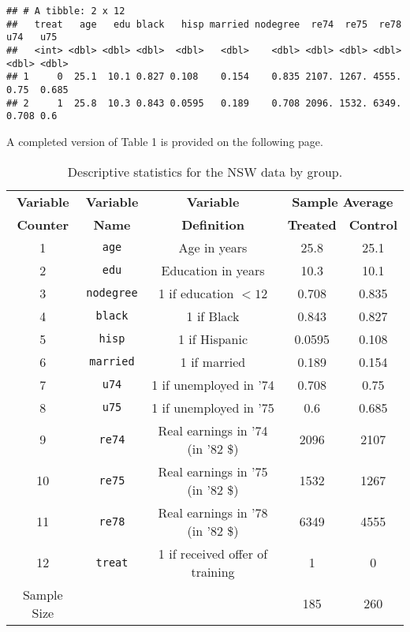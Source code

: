 \documentclass[
]{article}
\begin{document}
\begin{verbatim}
## # A tibble: 2 x 12
##   treat   age   edu black   hisp married nodegree  re74  re75  re78   u74   u75
##   <int> <dbl> <dbl> <dbl>  <dbl>   <dbl>    <dbl> <dbl> <dbl> <dbl> <dbl> <dbl>
## 1     0  25.1  10.1 0.827 0.108    0.154    0.835 2107. 1267. 4555. 0.75  0.685
## 2     1  25.8  10.3 0.843 0.0595   0.189    0.708 2096. 1532. 6349. 0.708 0.6
\end{verbatim}

A completed version of Table 1 is provided on the following page.
\newpage

\begin{table}[!ht!]
\centering
\begin{tabular}{ccccc}
\hline
\textbf{Variable} & \textbf{Variable}    & \textbf{Variable}    & \multicolumn{2}{c}{\textbf{Sample Average}}    \\ \cline{4-5} 
\textbf{Counter} & \textbf{Name}       & \textbf{Definition}                        & \textbf{Treated} & \textbf{Control} \\ \hline
1 & \texttt{age}      & Age in years                      & 25.8        & 25.1       \\
2 & \texttt{edu}      & Education in years                & 10.3        & 10.1       \\
3 & \texttt{nodegree} & 1 if education $<12$              & 0.708       & 0.835      \\
4 & \texttt{black}    & 1 if Black                        & 0.843       & 0.827      \\
5 & \texttt{hisp}     & 1 if Hispanic                     & 0.0595      & 0.108      \\
6 & \texttt{married}  & 1 if married                      & 0.189       & 0.154      \\
7 & \texttt{u74}      & 1 if unemployed in '74            & 0.708       & 0.75       \\
8 & \texttt{u75}      & 1 if unemployed in '75            & 0.6         & 0.685      \\
9 & \texttt{re74}     & Real earnings in '74 (in '82 \$)  & 2096        & 2107       \\
10 & \texttt{re75}    & Real earnings in '75 (in '82 \$)  & 1532        & 1267       \\
\hline 
11 & \texttt{re78}    & Real earnings in '78 (in '82 \$)  & 6349        & 4555       \\
12 & \texttt{treat}   & 1 if received offer of training   & 1           & 0          \\
\hline
Sample Size                                             &&& 185         & 260              \\ \hline
\end{tabular}
\caption{Descriptive statistics for the NSW data by group.}
\label{tab:Tab_NSW_1}
\end{table}
\end{document}
